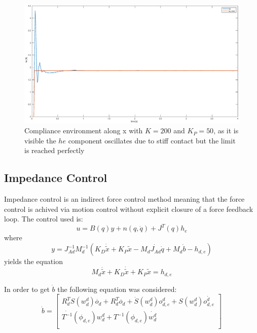 \documentclass[a4paper,12pt]{article}
\begin{document}
\begin{figure}[H]
    \begin{center}
        \hspace*{-0cm}
        \includegraphics[scale=0.25]{images/compliance_env.eps}
    \end{center}
    \caption{Compliance environment along x with $K = 200$ and $K_P = 50$, as it is visible the $he$ component oscillates due to stiff contact but the limit is reached perfectly}
    \label{fig:comliance_env}
\end{figure}

\subsection{Impedance Control}
Impedance control is an indirect force control method meaning that the force control is achived via motion control without explicit closure of a force feedback loop. The control used is:
\[
    u = B(q)y + n(q,\dot{q}) + J^T(q)h_e
\]
where
\[
    y = J_{Ad}^{-1}M_d^{-1}\left( K_D\dot{\tilde{x}} + K_P \tilde{x} - M_d\dot{J_{Ad}}\dot{q} + M_d\dot{b} - h_{d,e} \right)
\]
yields the equation
\[
    M_d\ddot{\tilde{x}} + K_D\dot{\tilde{x}} + K_P\tilde{x} = h_{d,e}
\]

In order to get $\dot{b}$ the following equation was considered:
\[
    \dot{b} = \begin{bmatrix}
        R_d^T S(w_d^d)\dot{o_d} + R_d^T\ddot{o_d} + \dot{S}(w_d^d)o_{d,e}^d + S(w_d^d)\dot{o_{d,e}^d}\\ 
    \dot{T^{-1}}(\phi_{d,e})w_d^d + T^{-1}(\phi_{d,e})\dot{w_d^d} \\
    \end{bmatrix}
\]
\end{document}
